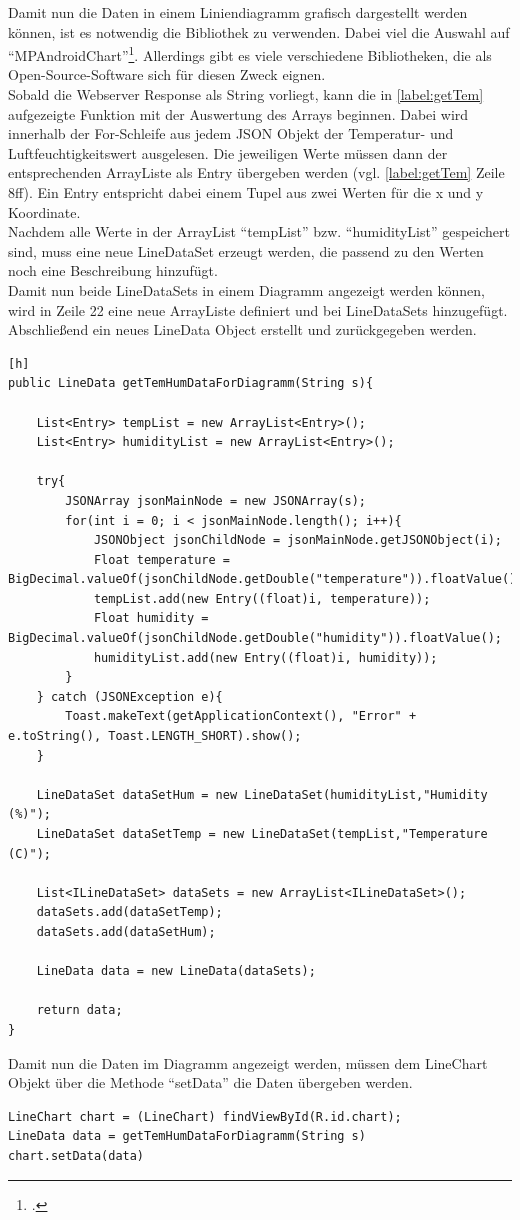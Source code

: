 Damit nun die Daten in einem Liniendiagramm grafisch dargestellt werden können, ist es notwendig die Bibliothek zu verwenden. Dabei viel die Auswahl auf \enquote{MPAndroidChart}\footcite{https://github.com/PhilJay/MPAndroidChart}. Allerdings gibt es viele verschiedene Bibliotheken, die als Open-Source-Software sich für diesen Zweck eignen.\\
Sobald die Webserver Response als String vorliegt, kann die in \autoref{label:getTem} aufgezeigte Funktion mit der Auswertung des Arrays beginnen. Dabei wird innerhalb der For-Schleife aus jedem \ac{JSON} Objekt der Temperatur- und Luftfeuchtigkeitswert ausgelesen. Die jeweiligen Werte müssen dann der entsprechenden ArrayListe als Entry übergeben werden (vgl. \autoref{label:getTem} Zeile 8ff). Ein Entry entspricht dabei einem Tupel aus zwei Werten für die x und y Koordinate.\\Nachdem alle Werte in der ArrayList \enquote{tempList} bzw. \enquote{humidityList} gespeichert sind, muss eine neue LineDataSet erzeugt werden, die passend zu den Werten noch eine Beschreibung hinzufügt. \\
Damit nun beide LineDataSets in einem Diagramm angezeigt werden können, wird in Zeile 22 eine neue ArrayListe definiert und bei LineDataSets hinzugefügt. Abschließend ein neues LineData Object erstellt und zurückgegeben werden. 

\begin{lstlisting}[label=label:getTem][h]
public LineData getTemHumDataForDiagramm(String s){

	List<Entry> tempList = new ArrayList<Entry>();
	List<Entry> humidityList = new ArrayList<Entry>();
	
	try{
		JSONArray jsonMainNode = new JSONArray(s);
		for(int i = 0; i < jsonMainNode.length(); i++){
			JSONObject jsonChildNode = jsonMainNode.getJSONObject(i);
			Float temperature = BigDecimal.valueOf(jsonChildNode.getDouble("temperature")).floatValue();
			tempList.add(new Entry((float)i, temperature));
			Float humidity = BigDecimal.valueOf(jsonChildNode.getDouble("humidity")).floatValue();
			humidityList.add(new Entry((float)i, humidity));
		}
	} catch (JSONException e){
		Toast.makeText(getApplicationContext(), "Error" + e.toString(), Toast.LENGTH_SHORT).show();
	}
	
	LineDataSet dataSetHum = new LineDataSet(humidityList,"Humidity (%)");	
	LineDataSet dataSetTemp = new LineDataSet(tempList,"Temperature (C)");
		
	List<ILineDataSet> dataSets = new ArrayList<ILineDataSet>();
	dataSets.add(dataSetTemp);
	dataSets.add(dataSetHum);
	
	LineData data = new LineData(dataSets);
	
	return data;
}
\end{lstlisting}

Damit nun die Daten im Diagramm angezeigt werden, müssen dem LineChart Objekt über die Methode \enquote{setData} die Daten übergeben werden. 
\begin{lstlisting}[label=list:showData]
LineChart chart = (LineChart) findViewById(R.id.chart);
LineData data = getTemHumDataForDiagramm(String s)
chart.setData(data)
\end{lstlisting}

